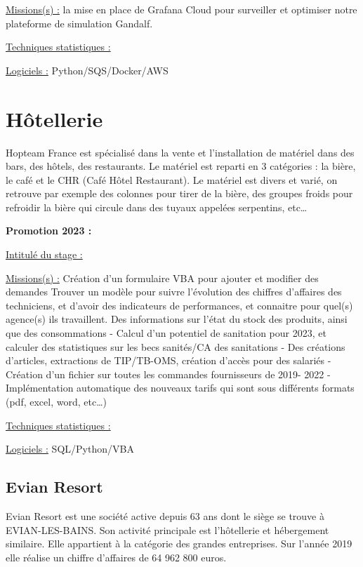 \documentclass[
  letterpaper,
  DIV=11,
  numbers=noendperiod]{scrreprt}
\begin{document}
\uline{Missions(s) :} la mise en place de Grafana Cloud pour surveiller
et optimiser notre plateforme de simulation Gandalf.

\uline{Techniques statistiques :}

\uline{Logiciels :} Python/SQS/Docker/AWS


\hypertarget{huxf4tellerie}{%
\chapter{Hôtellerie}\label{huxf4tellerie}}

Hopteam France est spécialisé dans la vente et l'installation de
matériel dans des bars, des hôtels, des restaurants. Le matériel est
reparti en 3 catégories : la bière, le café et le CHR (Café Hôtel
Restaurant). Le matériel est divers et varié, on retrouve par exemple
des colonnes pour tirer de la bière, des groupes froids pour refroidir
la bière qui circule dans des tuyaux appelées serpentins, etc\ldots{}

\textbf{Promotion 2023 :}

\uline{Intitulé du stage :}

\uline{Missions(s) :} Création d'un formulaire VBA pour ajouter et
modifier des demandes Trouver un modèle pour suivre l'évolution des
chiffres d'affaires des techniciens, et d'avoir des indicateurs de
performances, et connaitre pour quel(s) agence(s) ils travaillent. Des
informations sur l'état du stock des produits, ainsi que des
consommations - Calcul d'un potentiel de sanitation pour 2023, et
calculer des statistiques sur les becs sanités/CA des sanitations - Des
créations d'articles, extractions de TIP/TB-OMS, création d'accès pour
des salariés - Création d'un fichier sur toutes les commandes
fournisseurs de 2019- 2022 - Implémentation automatique des nouveaux
tarifs qui sont sous différents formats (pdf, excel, word, etc\ldots)

\uline{Techniques statistiques :}

\uline{Logiciels :} SQL/Python/VBA

\hypertarget{evian-resort}{%
\section{\texorpdfstring{\textbf{Evian
Resort}}{Evian Resort}}\label{evian-resort}}

Evian Resort est une société active depuis 63 ans dont le siège se
trouve à EVIAN-LES-BAINS. Son activité principale est l'hôtellerie et
hébergement similaire. Elle appartient à la catégorie des grandes
entreprises. Sur l'année 2019 elle réalise un chiffre d'affaires de 64
962 800 euros.
\end{document}
